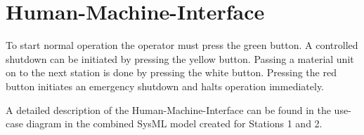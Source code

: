\documentclass[12pt]{article}
\begin{document}
\section{Human-Machine-Interface}

To start normal operation the operator must press the green button. A controlled shutdown
can be initiated by pressing the yellow button. Passing a material unit on to the next station
is done by pressing the white button. Pressing the red button initiates an emergency shutdown and
halts operation immediately.

A detailed description of the Human-Machine-Interface can be found in the
use-case diagram in the combined SysML model created for Stations 1 and 2.
\end{document}
